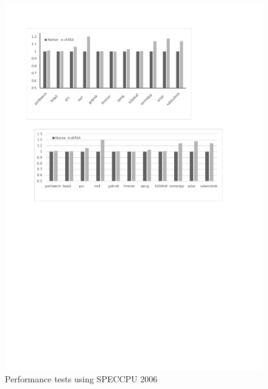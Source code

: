 \documentclass[conference]{IEEEtran}
\begin{document}
\begin{figure}
    \centering
    \includegraphics[scale=0.5]{pic/spec_1.pdf}
    \caption{Performance tests using SPECCPU 2006}
    \label{spec}
\end{figure}
\end{document}

